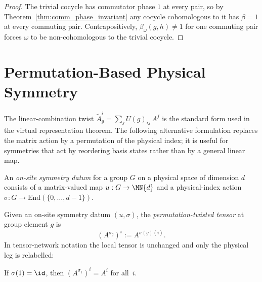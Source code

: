 \begin{proof}\leanok{}
    The trivial cocycle has commutator phase $1$ at every pair, so by
    Theorem~\ref{thm:comm_phase_invariant} any cocycle cohomologous to it has
    $\beta = 1$ at every commuting pair.  Contrapositively, $\beta_\omega(g,h)\neq
        1$ for one commuting pair forces $\omega$ to be non-cohomologous to the
    trivial cocycle.
\end{proof}

\section{Permutation-Based Physical Symmetry}

The linear-combination twist $\widetilde{A}_g^i = \sum_j U(g)_{ij}\, A^j$
is the standard form used in the virtual representation theorem.
The following alternative formulation replaces the matrix action by a
permutation of the physical index; it is useful for symmetries that act by
reordering basis states rather than by a general linear map. %

\begin{definition}\label{def:on_site_symmetry_perm}
    \leanok
    An \emph{on-site symmetry datum} for a group $G$ on a physical
    space of dimension $d$ consists of a matrix-valued map
    $u : G \to \MN{d}$ and a physical-index action
    $\sigma : G \to \mathrm{End}(\{0,\ldots,d{-}1\})$.
\end{definition}

\begin{definition}\label{def:perm_twisted_tensor}
    \leanok
    Given an on-site symmetry datum $(u, \sigma)$, the
    \emph{permutation-twisted tensor} at group element $g$ is
    \[
        (A^{\sigma_g})^i :=  A^{\sigma(g)(i)}.
    \]
    In tensor-network notation the local tensor is unchanged and only the
    physical leg is relabelled:
    \begin{center}
    \end{center}
\end{definition}

\begin{lemma}\label{lem:perm_twisted_one}
    \leanok
    If $\sigma(1) = \id$, then $(A^{\sigma_1})^i = A^i$ for all~$i$.
\end{lemma}

